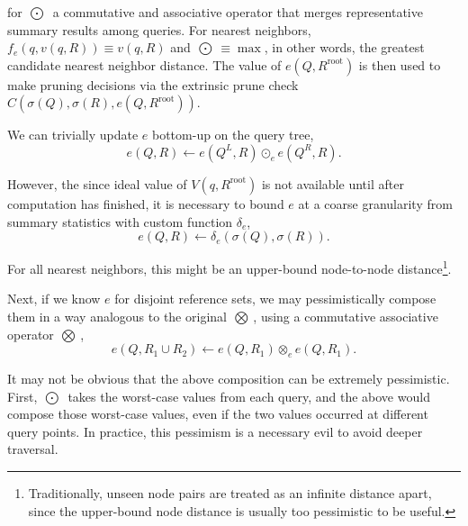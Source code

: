 \documentclass[twoside,leqno,twocolumn]{article}
\newcommand{\authornote}[1]{(\footnote{Note to self: #1})}
\newcommand{\union}{\cup}
\newcommand{\summary}{\delta}
\newcommand{\kdroot}[1]{#1^{\text{root}}}
\newcommand{\kdleft}[1]{#1^{\!L}}
\newcommand{\kdright}[1]{#1^{\!R}}
\newcommand{\nameOp}[2]{\mathop{#1\nolimits\!\!_{#2}}}
\newcommand{\nameop}[2]{#1_{\!#2}}
\newcommand{\myOp}[1]{\nameOp{\bigotimes}{#1}}
\newcommand{\myop}[1]{\nameop{\otimes}{#1}}
\newcommand{\letterqr}{v}
\newcommand{\outqr}{V}
\newcommand{\inqr}{v}
\newcommand{\Opqr}{\myOp{\letterqr}}
\newcommand{\lettermu}{e}
\newcommand{\inmu}{e}
\newcommand{\Outopmu}{\nameOp{\bigodot}{\lettermu}}%
\newcommand{\outopmu}{\nameop{\odot}{\lettermu}}
\newcommand{\Opmu}{\myOp{\lettermu}}
\newcommand{\opmu}{\myop{\lettermu}}
\newcommand{\fmu}{f_{\lettermu}}
\newcommand{\deltamu}{\summary_{\lettermu}}
\newcommand{\canprunemu}{C}
\newcommand{\outstat}{\sigma}
\begin{document}
\noindent for $\Outopmu$ a commutative and associative operator that merges representative summary results among queries.
For nearest neighbors, $\fmu(q, \inqr(q, R)) \equiv \inqr(q, R)$ and $\Outopmu \equiv \max$, in other words, the greatest candidate nearest neighbor distance.
The value of $\inmu(Q, \kdroot{R})$ is then used to make pruning decisions via the extrinsic prune check $\canprunemu(\outstat(Q), \outstat(R), \inmu(Q, \kdroot{R}))$.

We can trivially update $e$ bottom-up on the query tree,
\begin{equation}
\inmu(Q, R) \gets \inmu(\kdleft{Q}, R) \outopmu \inmu(\kdright{Q}, R).
\label{eqn:muchild}
\end{equation}

\noindent
However, the since ideal value of $\outqr(q, \kdroot{R})$ is not available until after computation has finished, it is necessary to bound $\inmu$ at a coarse granularity from summary statistics with custom function $\deltamu$,
\begin{equation}
\inmu(Q, R) \gets \deltamu(\outstat(Q), \outstat(R)).
\label{eqn:mudelta}
\end{equation}

\noindent
For all nearest neighbors, this might be an upper-bound node-to-node distance\footnote{Traditionally, unseen node pairs are treated as an infinite distance apart, since the upper-bound node distance is usually too pessimistic to be useful.}.

Next, if we know $\inmu$ for disjoint reference sets, we may pessimistically compose them in a way analogous to the original $\Opqr$, using a commutative associative operator $\Opmu$,
\begin{equation}
\inmu(Q, R_1 \union R_2) \gets \inmu(Q, R_1) \opmu \inmu(Q, R_1).
\label{eqn:mucompose}
\end{equation}

\noindent
It may not be obvious that the above composition can be extremely pessimistic.
First, $\Outopmu$ takes the worst-case values from each query, and the above would compose those worst-case values, even if the two values occurred at different query points.
In practice, this pessimism is a necessary evil to avoid deeper traversal.
\end{document}

